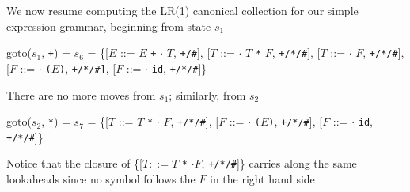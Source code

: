 \documentclass[8pt,a4paper,compress]{beamer}
\newcommand{\mm}[1]{$#1$}
\newcommand{\subs}[2]{${#1}_{#2}$}
\newenvironment{spaced}
{
\smallskip
\hspace{.5cm}
\begin{minipage}[c]{\textwidth}
}
{
\end{minipage}
\smallskip
}
\begin{document}
\begin{frame}[fragile]
\pause

We now resume computing the LR(1) canonical collection for our simple expression grammar, beginning from state $s_1$

\text{ }
\begin{spaced}
\begin{production}
goto(\subs{s}{1}, \lstinline{+}) = \subs{s}{6}
               = \{[\mm{E}  ::= \mm{E} \lstinline{+} \mm{\cdot} \mm{T}, \lstinline{+/#}],
                    [\mm{T}  ::= \mm{\cdot} \mm{T} \lstinline{*} \mm{F}, \lstinline{+/*/#}],
                    [\mm{T}  ::= \mm{\cdot} \mm{F}, \lstinline{+/*/#}],
                    [\mm{F}  ::= \mm{\cdot} \lstinline{(}\mm{E}\lstinline{)},  \lstinline{+/*/#]},
                    [\mm{F}  ::= \mm{\cdot} \lstinline{id}, \lstinline{+/*/#}]\}
\end{production}
\end{spaced}

\pause

There are no more moves from $s_1$; similarly, from $s_2$

\text{ }
\begin{spaced}
\begin{production}
goto(\subs{s}{2}, \lstinline{*}) = \subs{s}{7}
               = \{[\mm{T}  ::= \mm{T} \lstinline{*} \mm{\cdot} \mm{F}, \lstinline{+/*/#}],
                    [\mm{F}  ::= \mm{\cdot} \lstinline{(}\mm{E}\lstinline{)}, \lstinline{+/*/#}],
                    [\mm{F}  ::= \mm{\cdot} \lstinline{id}, \lstinline{+/*/#}]\}
\end{production}
\end{spaced}

\pause

Notice that the closure of  \{[$T  ::= T$ \lstinline{*} $\cdot F$, \lstinline{+/*/#}]\} carries along the same lookaheads since no symbol follows the $F$ in the right hand side
\end{frame}
\end{document}
